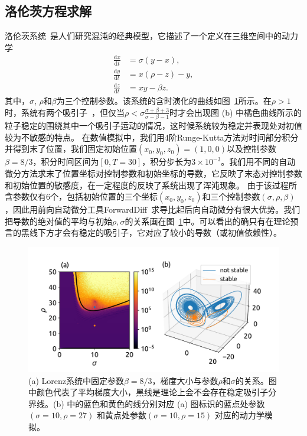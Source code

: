 \documentclass[A4,twoside,UTF8]{ctexart}
\def\D{\mathrm{d}}
\begin{document}
\subsection{洛伦茨方程求解}
洛伦茨系统~\cite{Lorenz1963}是人们研究混沌的经典模型，它描述了一个定义在三维空间中的动力学
\begin{align*}
    \frac{\D x}{\D t} &= \sigma(y - x),\\
    \frac{\D y}{\D t} &= x(\rho -z) - y,\\
    \frac{\D z}{\D t} &= xy-\beta z.
\end{align*}
其中，$\sigma$, $\rho$和$\beta$为三个控制参数。该系统的含时演化的曲线如图~\ref{fig:chaos}所示。在$\rho>1$时，系统有两个吸引子~\cite{Hirsch2012}，但仅当$\rho < \sigma \frac{\sigma + \beta + 3}{\sigma - \beta - 1}$时才会出现图 (b) 中橘色曲线所示的粒子稳定的围绕其中一个吸引子运动的情况，这时候系统较为稳定并表现处对初值较为不敏感的特点。
在数值模拟中，我们用4阶Runge-Kutta方法对时间部分积分并得到末了位置，我们固定初始位置$(x_0,y_0,z_0) = (1, 0, 0)$以及控制参数$\beta=8/3$，积分时间区间为$[0,T=30]$，积分步长为$3\times 10^{-3}$。我们用不同的自动微分方法求末了位置坐标对控制参数和初始坐标的导数，它反映了末态对控制参数和初始位置的敏感度，在一定程度的反映了系统出现了浑沌现象。
由于该过程所含参数仅有6个，包括初始位置的三个坐标$(x_0, y_0, z_0)$和三个控制参数$(\sigma, \rho,\beta)$，因此用前向自动微分工具ForwardDiff~\cite{Revels2016}求导比起后向自动微分有很大优势。我们把导数的绝对值的平均与初始$\rho,\sigma$的关系画在图~\ref{fig:chaos}中。可以看出的确只有在理论预言的黑线下方才会有稳定的吸引子，它对应了较小的导数（或初值依赖性）。
\begin{figure}[t]
\centering
\includegraphics[width=0.8\columnwidth]{./fig4.pdf}
    \caption{(a) Lorenz系统中固定参数$\beta=8/3$，梯度大小与参数$\rho$和$\sigma$的关系。图中颜色代表了平均梯度大小，黑线是理论上会不会存在稳定吸引子分界线。(b) 中的蓝色和黄色的线分别对应 (a) 图标识的蓝点处参数 $(\sigma=10, \rho=27)$ 和黄点处参数$(\sigma=10, \rho=15)$ 对应的动力学模拟。\label{fig:chaos}}
\end{figure}
\end{document}
